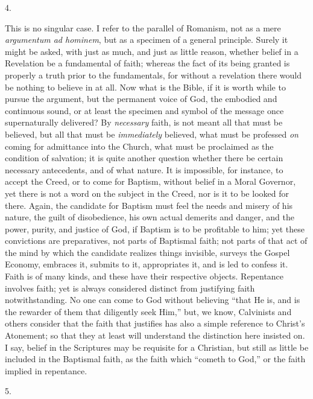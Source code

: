 4.

This is no singular case. I refer to the parallel of Romanism, not
as a mere \emph{argumentum ad hominem}, but as a specimen of a general
principle. Surely it might be asked, with just as much, and just as
little reason, whether belief in a Revelation be a fundamental of
faith; whereas the fact of its being granted is properly a truth prior
to the fundamentals, for without a revelation there would be nothing
to believe in at all. Now what is the Bible, if it is worth while to
pursue the argument, but the permanent voice of God, the embodied and
continuous sound, or at least the specimen and symbol of the message
once supernaturally delivered? By \emph{necessary} faith, is not meant
all that must be believed, but all that must be \emph{immediately}
believed, what must be professed \emph{on} coming for admittance into
the Church, what must be proclaimed as the condition of salvation; it
is quite another question whether there be certain necessary
antecedents, and of what nature. It is impossible, for instance, to
accept the Creed, or to come for Baptism, without belief in a Moral
Governor, yet there is not a word on the subject in the Creed, nor is
it to be looked for there. Again, the candidate for Baptism must feel the needs and misery of his nature, the guilt of disobedience,
his own actual demerits and danger, and the power, purity, and justice
of God, if Baptism is to be profitable to him; yet these convictions
are preparatives, not parts of Baptismal faith; not parts of that act
of the mind by which the candidate realizes things invisible, surveys
the Gospel Economy, embraces it, submits to it, appropriates it, and
is led to confess it. Faith is of many kinds, and these have their
respective objects. Repentance involves faith; yet is always
considered distinct from justifying faith notwithstanding. No one can
come to God without believing ``that He is, and is the rewarder of
them that diligently seek Him,'' but, we know, Calvinists and
others consider that the faith that justifies has also a simple
reference to Christ's Atonement; so that they at least will understand
the distinction here insisted on. I say, belief in the Scriptures may
be requisite for a Christian, but still as little be included in the
Baptismal faith, as the faith which ``cometh to God,'' or the
faith implied in repentance.

5.

